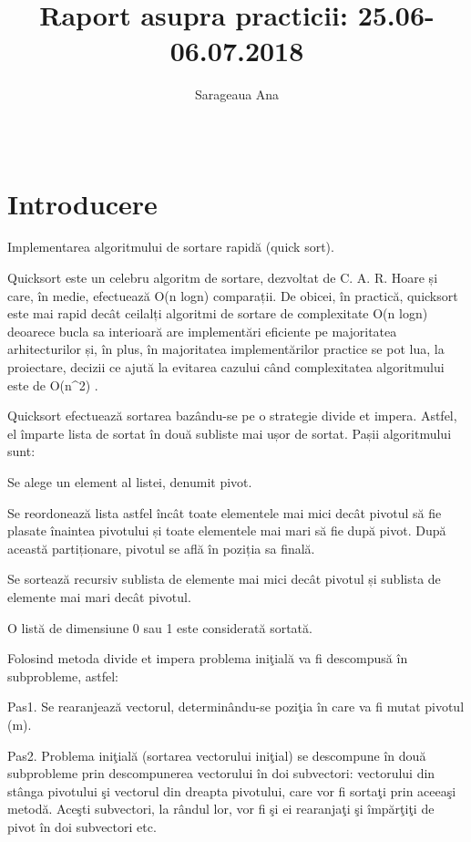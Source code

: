 \documentclass{report}
\title{{\sc Raport asupra practicii: 25.06-06.07.2018}}
\author{Sarageaua Ana}
\date{\,}
\begin{document}
\maketitle

\tableofcontents

\chapter{Introducere}

 \item Implementarea algoritmului de sortare rapidă (quick sort). \newline

Quicksort este un celebru algoritm de sortare, dezvoltat de C. A. R. Hoare și care, în medie, efectuează O(n logn) comparații. De obicei, în practică, quicksort este mai rapid decât ceilalți algoritmi de sortare de complexitate O(n logn) deoarece bucla sa interioară are implementări eficiente pe majoritatea arhitecturilor și, în plus, în majoritatea implementărilor practice se pot lua, la proiectare, decizii ce ajută la evitarea cazului când complexitatea algoritmului este de {\displaystyle O(n^{2})} .

Quicksort efectuează sortarea bazându-se pe o strategie divide et impera. Astfel, el împarte lista de sortat în două subliste mai ușor de sortat. Pașii algoritmului sunt:

Se alege un element al listei, denumit pivot.

Se reordonează lista astfel încât toate elementele mai mici decât pivotul să fie plasate înaintea pivotului și toate elementele mai mari să fie după pivot. După această partiționare, pivotul se află în poziția sa finală.

Se sortează recursiv sublista de elemente mai mici decât pivotul și sublista de elemente mai mari decât pivotul.

O listă de dimensiune 0 sau 1 este considerată sortată.

Folosind metoda divide et impera problema iniţială va fi descompusă în subprobleme, astfel:

Pas1. Se rearanjează vectorul, determinându-se poziţia în care va fi mutat pivotul (m).

Pas2. Problema iniţială (sortarea vectorului iniţial) se descompune în două subprobleme prin descompunerea vectorului în doi subvectori: vectorului din stânga pivotului şi vectorul din dreapta
pivotului, care vor fi sortaţi prin aceeaşi metodă. Aceşti subvectori, la rândul lor, vor fi şi ei rearanjaţi şi împărţiţi de pivot în doi subvectori etc. 
\end{document}
